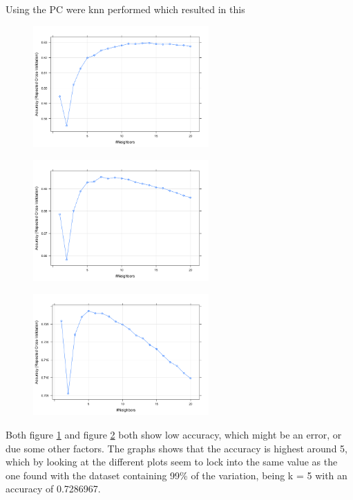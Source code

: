 Using the PC were knn performed which resulted in this

\begin{figure}[H]
\centering
\includegraphics[width = 0.6\textwidth]{graphics/kNN_plot_80.png}
\caption{}
\label{fig:knnFit_80}
\end{figure}


\begin{figure}[H]
\centering
\includegraphics[width = 0.6\textwidth]{graphics/kNN_plot_90.png}
\caption{}
\label{fig:knnFit_90}
\end{figure}


\begin{figure}[H]
\centering
\includegraphics[width = 0.6\textwidth]{graphics/kNN_plot_99.png}
\caption{}
\label{fig:knnFit_99}
\end{figure}

Both figure \ref{fig:knnFit_80} and figure \ref{fig:knnFit_90} both show low accuracy, which might be an error, or due some other factors.  The graphs shows that the accuracy is highest around 5, which by looking at the different plots seem to lock into the same value as the one found with the dataset containing 99\% of the variation, being k = 5 with an accuracy of 0.7286967.  

